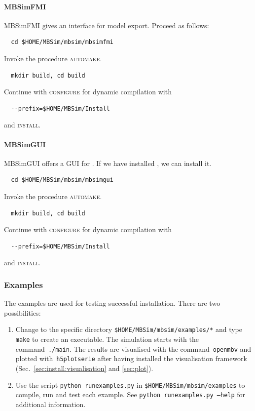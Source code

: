 \paragraph{MBSimFMI}
MBSimFMI gives an interface for model export. Proceed as follows:
\begin{verbatim}
  cd $HOME/MBSim/mbsim/mbsimfmi
\end{verbatim}
Invoke the procedure \textsc{automake}.
\begin{verbatim}
  mkdir build, cd build
\end{verbatim}
Continue with \textsc{configure} for dynamic compilation with
\begin{verbatim}
  --prefix=$HOME/MBSim/Install
\end{verbatim}
and \textsc{install}.
%
\paragraph{MBSimGUI}
MBSimGUI offers a GUI for \MBSim{}. If we have installed \OpenMBV{}, we can install it.
\begin{verbatim}
  cd $HOME/MBSim/mbsim/mbsimgui
\end{verbatim}
Invoke the procedure \textsc{automake}.
\begin{verbatim}
  mkdir build, cd build
\end{verbatim}
Continue with \textsc{configure} for dynamic compilation with
\begin{verbatim}
  --prefix=$HOME/MBSim/Install
\end{verbatim}
and \textsc{install}.

\subsubsection{Examples}
The examples are used for testing successful installation. There are two possibilities:
\begin{enumerate}
\item Change to the specific directory \texttt{\$HOME/MBSim/mbsim/examples/*} and type \texttt{make} to create an executable. The simulation starts with the command~\texttt{./main}. The results are visualised with the command~\texttt{openmbv} and plotted with~\texttt{h5plotserie} after having installed the visualisation framework (Sec.~\ref{sec:install:visualisation} and \ref{sec:plot}).
\item Use the script \texttt{python runexamples.py} in \texttt{\$HOME/MBSim/mbsim/examples} to compile, run and test each example. See \texttt{python runexamples.py --help} for additional information.
\end{enumerate}
%
